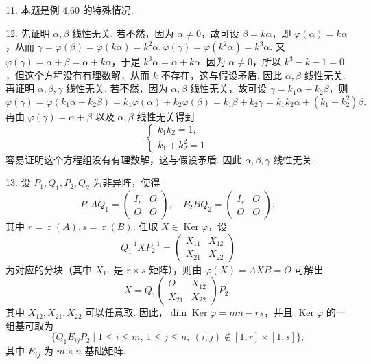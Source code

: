 \documentclass[UTF8, 12pt, fontset=fandol, oneside]{ctexart}
\begin{document}
11. 本题是例 4.60 的特殊情况.

12. 先证明 $\alpha,\beta$ 线性无关. 若不然，因为 $\alpha\ne0$，故可设 $\beta=k\alpha$，即 $\varphi(\alpha)=k\alpha$，从而 $\gamma=\varphi(\beta)=\varphi(k\alpha)=k^2\alpha,\varphi(\gamma)=\varphi(k^2\alpha)=k^3\alpha$. 又 $\varphi(\gamma)=\alpha+\beta=\alpha+k\alpha$，于是 $k^3\alpha=\alpha+k\alpha$. 因为 $\alpha\ne0$，所以 $k^3-k-1=0$，但这个方程没有有理数解，从而 $k$ 不存在，这与假设矛盾. 因此 $\alpha,\beta$ 线性无关. 再证明 $\alpha,\beta,\gamma$ 线性无关. 若不然，因为 $\alpha,\beta$ 线性无关，故可设 $\gamma=k_1\alpha+k_2\beta$，则
\[
\varphi(\gamma)=\varphi(k_1\alpha+k_2\beta)=k_1\varphi(\alpha)+k_2\varphi(\beta)=k_1\beta+k_2\gamma
=k_1k_2\alpha+(k_1+k_2^2)\beta.
\]
再由 $\varphi(\gamma)=\alpha+\beta$ 以及 $\alpha,\beta$ 线性无关得到
\[
\left\{
\begin{array}{l}
k_1k_2=1,\\
k_1+k_2^2=1.
\end{array}
\right.
\]
容易证明这个方程组没有有理数解，这与假设矛盾. 因此 $\alpha,\beta,\gamma$ 线性无关.

13. 设 $P_1,Q_1,P_2,Q_2$ 为非异阵，使得
\[
P_1AQ_1=\left(\begin{array}{cc}I_r&O\\O&O\end{array}\right),\quad
P_2BQ_2=\left(\begin{array}{cc}I_s&O\\O&O\end{array}\right),
\]
其中 $r=\operatorname{r}(A),s=\operatorname{r}(B)$. 任取 $X\in\operatorname{Ker}\varphi$，设
\[
Q_1^{-1}XP_2^{-1}=\left(\begin{array}{cc}X_{11}&X_{12}\\X_{21}&X_{22}\end{array}\right)
\]
为对应的分块（其中 $X_{11}$ 是 $r\times s$ 矩阵），则由 $\varphi(X)=AXB=O$ 可解出
\[
X=Q_1\left(\begin{array}{cc}O&X_{12}\\X_{21}&X_{22}\end{array}\right)P_2,
\]
其中 $X_{12},X_{21},X_{22}$ 可以任意取. 因此，$\dim\operatorname{Ker}\varphi=mn-rs$，并且 $\operatorname{Ker}\varphi$ 的一组基可取为
\[
\{Q_1E_{ij}P_2\mid 1\le i\le m,\ 1\le j\le n,\ (i,j)\notin[1,r]\times[1,s]\},
\]
其中 $E_{ij}$ 为 $m\times n$ 基础矩阵.
\end{document}
